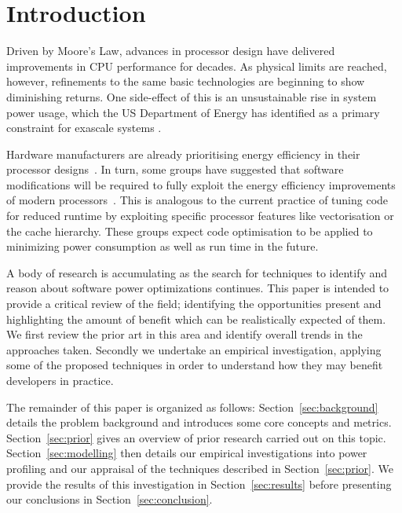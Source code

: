 \section*{Introduction \golden}
Driven by Moore's Law, advances in processor design have delivered improvements in CPU performance for decades. As physical limits are reached, however, refinements to the same basic technologies are beginning to show diminishing returns. One side-effect of this is an unsustainable rise in system power usage, which the US Department of Energy has identified as a primary constraint for exascale systems \cite{shalf:2011aa}. \golden

Hardware manufacturers are already prioritising energy efficiency in their processor designs~\cite{kurd:2014aa}. In turn, some groups have suggested that software modifications will be required to fully exploit the energy efficiency improvements of modern processors~\cite{shao:2013aa}. This is analogous to the current practice of tuning code for reduced runtime by exploiting specific processor features like vectorisation or the cache hierarchy. These groups expect code optimisation to be applied to minimizing power consumption as well as run time in the future. \golden

A body of research is accumulating as the search for techniques to identify and reason about software power optimizations continues. This paper is intended to provide a critical review of the field; identifying the opportunities present and highlighting the amount of benefit which can be realistically expected of them. We first review the prior art in this area and identify overall trends in the approaches taken. Secondly we undertake an empirical investigation, applying some of the proposed techniques in order to understand how they may benefit developers in practice. \golden

The remainder of this paper is organized as follows: Section~\ref{sec:background} details the problem background and introduces some core concepts and metrics. Section~\ref{sec:prior} gives an overview of prior research carried out on this topic. Section~\ref{sec:modelling} then details our empirical investigations into power profiling and our appraisal of the techniques described in Section~\ref{sec:prior}. We provide the results of this investigation in Section~\ref{sec:results} before presenting our conclusions in Section~\ref{sec:conclusion}. \golden